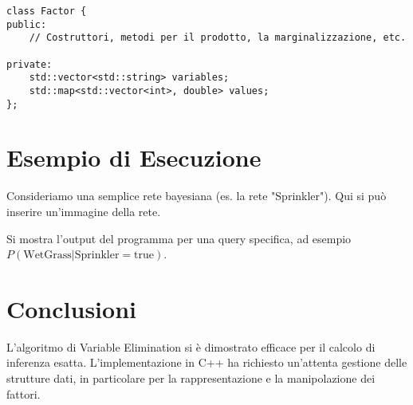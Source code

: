 \documentclass[a4paper, 11pt]{article}
\begin{document}
\begin{lstlisting}[caption={Esempio di scheletro della classe Factor in C++.}, label=lst:factor]
class Factor {
public:
    // Costruttori, metodi per il prodotto, la marginalizzazione, etc.

private:
    std::vector<std::string> variables;
    std::map<std::vector<int>, double> values;
};
\end{lstlisting}

\section{Esempio di Esecuzione}
Consideriamo una semplice rete bayesiana (es. la rete "Sprinkler"). Qui si può inserire un'immagine della rete.


Si mostra l'output del programma per una query specifica, ad esempio $P(\text{WetGrass} | \text{Sprinkler}=\text{true})$.

\section{Conclusioni}
L'algoritmo di Variable Elimination si è dimostrato efficace per il calcolo di inferenza esatta. L'implementazione in C++ ha richiesto un'attenta gestione delle strutture dati, in particolare per la rappresentazione e la manipolazione dei fattori.
\end{document}
